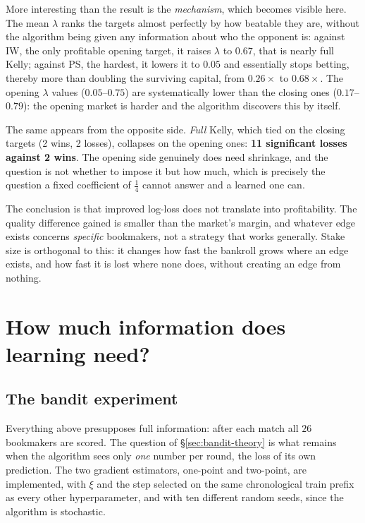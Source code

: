 \documentclass[12pt,a4paper,oneside]{report}
\renewcommand{\_}{\oldunderscore\allowbreak}
\theoremstyle{definition}
\theoremstyle{plain}
\theoremstyle{remark}
\begin{document}
More interesting than the result is the \emph{mechanism}, which becomes visible here. The mean
$\lambda$ ranks the targets almost perfectly by how beatable they are, without the algorithm being
given any information about who the opponent is: against IW, the only profitable opening target,
it raises $\lambda$ to $0.67$, that is nearly full Kelly; against PS, the hardest, it lowers it to
$0.05$ and essentially stops betting, thereby more than doubling the surviving capital, from
$0.26\times$ to $0.68\times$. The opening $\lambda$ values ($0.05$--$0.75$) are systematically
lower than the closing ones ($0.17$--$0.79$): the opening market is harder and the algorithm
discovers this by itself.

The same appears from the opposite side. \emph{Full} Kelly, which tied on the closing targets
(2 wins, 2 losses), collapses on the opening ones: \textbf{11 significant losses against 2 wins}.
The opening side genuinely does need shrinkage, and the question is not whether to impose it but
how much, which is precisely the question a fixed coefficient of $\tfrac14$ cannot answer and a
learned one can.

The conclusion is that improved log-loss does not translate into profitability. The quality
difference gained is smaller than the market's margin, and whatever edge exists concerns
\emph{specific} bookmakers, not a strategy that works generally. Stake size is orthogonal to
this: it changes how fast the bankroll grows where an edge exists, and how fast it is lost where
none does, without creating an edge from nothing.

\section{How much information does learning need?}

\subsection{The bandit experiment}
\label{sec:res-bandit}

Everything above presupposes full information: after each match all $26$ bookmakers are scored.
The question of \S\ref{sec:bandit-theory} is what remains when the algorithm sees only \emph{one}
number per round, the loss of its own prediction. The two gradient estimators, one-point and
two-point, are implemented, with $\xi$ and the step selected on the same chronological train
prefix as every other hyperparameter, and with ten different random seeds, since the algorithm is
stochastic.
\end{document}
